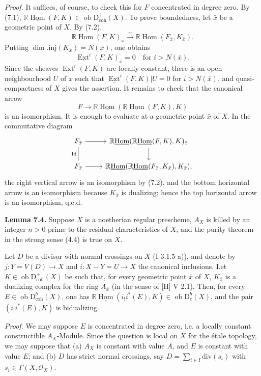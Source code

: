 \documentclass[11pt]{article}
\DeclareMathOperator{\Hom}{Hom}
\DeclareMathOperator{\Ext}{Ext}
\newcommand{\D}{\mathrm{D}}
\newcommand{\ob}{\operatorname{ob}}
\providecommand{\Hom}{\operatorname{Hom}}
\providecommand{\ob}{\operatorname{ob}}
\providecommand{\Hom}{\operatorname{Hom}}
\begin{document}
\emph{Proof.} It suffices, of course, to check this for $F$ concentrated in degree zero. By (7.1), $\mathbb{R}\underline{\Hom}(F,K)\in\ob\D^{+}_{\mathrm{coh}}(X)$. To prove boundedness, let $\bar{x}$ be a geometric point of $X$. By (7.2),
\[
        \mathbb{R}\underline{\Hom}(F,K)_{\bar{x}}\xrightarrow{\sim} \mathbb{R}\underline{\Hom}(F_{\bar{x}},K_{\bar{x}}).
\]
Putting $\dim.\mathrm{inj}(K_{\bar{x}})=N(\bar{x})$, one obtains
\[
        \underline{\Ext}^i(F,K)_{\bar{x}}=0\quad\text{for }i>N(\bar{x}).
\]
Since the sheaves $\underline{\Ext}^{i}(F,K)$ are locally constant, there is an open neighbourhood $U$ of $x$ such that $\underline{\Ext}^{i}(F,K)|U=0$ for $i>N(\bar{x})$, and quasi-compactness of $X$ gives the assertion. It remains to check that the canonical arrow
\[
        F\longrightarrow \mathbb{R}\underline{\Hom}(\mathbb{R}\underline{\Hom}(F,K),K)
\]
is an isomorphism. It is enough to evaluate at a geometric point $\bar{x}$ of $X$. In the commutative diagram
\[
\begin{tikzcd}
F_{\bar{x}} \arrow[r] \arrow[d,dash,"\mathrm{Id}"'] & \mathbb{R}\underline{\Hom}(\mathbb{R}\underline{\Hom}(F,K),K)_{\bar{x}} \arrow[d]\\
F_{\bar{x}} \arrow[r] & \mathbb{R}\underline{\Hom}(\mathbb{R}\underline{\Hom}(F_{\bar{x}},K_{\bar{x}}),K_{\bar{x}}),
\end{tikzcd}
\]
the right vertical arrow is an isomorphism by (7.2), and the bottom horizontal arrow is an isomorphism because $K_{\bar{x}}$ is dualizing; hence the top horizontal arrow is an isomorphism, q.e.d.

\textbf{Lemma 7.4.} Suppose $X$ is a noetherian regular prescheme, $A_X$ is killed by an integer $n>0$ prime to the residual characteristics of $X$, and the purity theorem in the strong sense (4.4) is true on $X$.

Let $D$ be a divisor with normal crossings on $X$ (I 3.1.5 a)), and denote by $j:Y=V(D)\to X$ and $i:X-Y=U\to X$ the canonical inclusions. Let $K\in\ob\D^{+}_{\mathrm{coh}}(X)$ be such that, for every geometric point $\bar{x}$ of $X$, $K_{\bar{x}}$ is a dualizing complex for the ring $A_{\bar{x}}$ (in the sense of [H] V 2.1). Then, for every $E\in\ob\D^{b}_{\mathrm{coh}}(X)$, one has $\mathbb{R}\underline{\Hom}(i_!i^*(E),K)\in\ob\D^{b}_{c}(X)$, and the pair $(i_!i^*(E),K)$ is bidualizing.

\emph{Proof.} We may suppose $E$ is concentrated in degree zero, i.e. a locally constant constructible $A_X$-Module. Since the question is local on $X$ for the étale topology, we may suppose that (a) $A_X$ is constant with value $A$, and $E$ is constant with value $E$; and (b) $D$ has strict normal crossings, say $D=\sum_{i\in I}\mathrm{div}(s_i)$ with $s_i\in\Gamma(X,\mathcal{O}_X)$.
\end{document}
